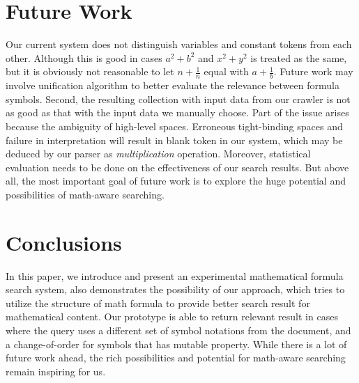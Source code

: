 \documentclass{acm_proc_article-sp}
\begin{document}
\section{Future Work}
Our current system does not distinguish variables and constant tokens from each other. Although this is good in cases $a^2 + b^2$ and $x^2 + y^2$ is treated as the same, but it is obviously not reasonable to let $n+\frac{1}{n}$ equal with $a+\frac{1}{b}$. Future work may involve unification algorithm\cite{Baader} to better evaluate the relevance between formula symbols. Second, the resulting collection with input data from our crawler is not as good as that with the input data we manually choose. Part of the issue arises because the ambiguity of high-level spaces\cite{Richard}. Erroneous tight-binding spaces and failure in interpretation will result in blank token in our system, which may be deduced by our parser as \textit{multiplication} operation. Moreover, statistical evaluation needs to be done on the effectiveness of our search results. But above all, the most important goal of future work is to explore the huge potential and possibilities of math-aware searching.

\section{Conclusions}
In this paper, we introduce and present an experimental mathematical formula search system, also demonstrates the possibility of our approach, which tries to utilize the structure of math formula to provide better search result for mathematical content. Our prototype is able to return relevant result in cases where the query uses a different set of symbol notations from the document, and a change-of-order for symbols that has mutable property. While there is a lot of future work ahead, the rich possibilities and potential for math-aware searching remain 
inspiring for us.


\end{document}
